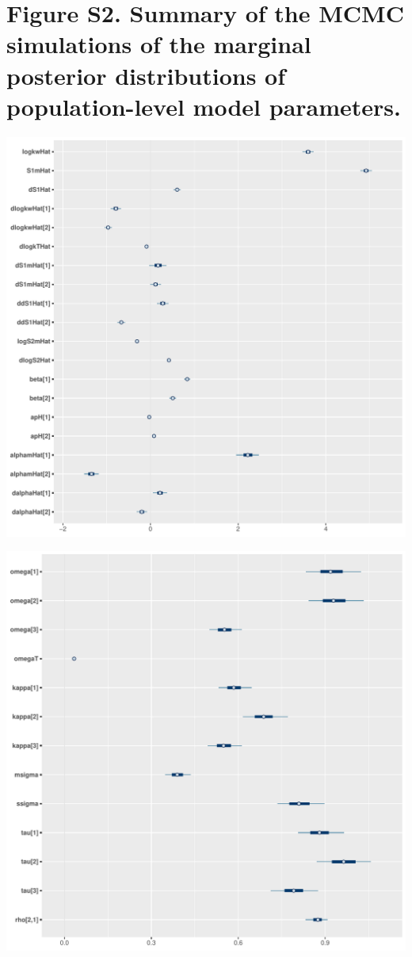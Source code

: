 \documentclass[
]{article}
\begin{document}
\newpage{}

\hypertarget{figure-s2.-summary-of-the-mcmc-simulations-of-the-marginal-posterior-distributions-of-population-level-model-parameters.}{%
\section{Figure S2. Summary of the MCMC simulations of the marginal
posterior distributions of population-level model
parameters.}\label{figure-s2.-summary-of-the-mcmc-simulations-of-the-marginal-posterior-distributions-of-population-level-model-parameters.}}

\includegraphics{../figures/param/XBridgeShieldRP18_1.pdf}

\newpage{}

\includegraphics{../figures/param/XBridgeShieldRP18_2.pdf}
\end{document}
